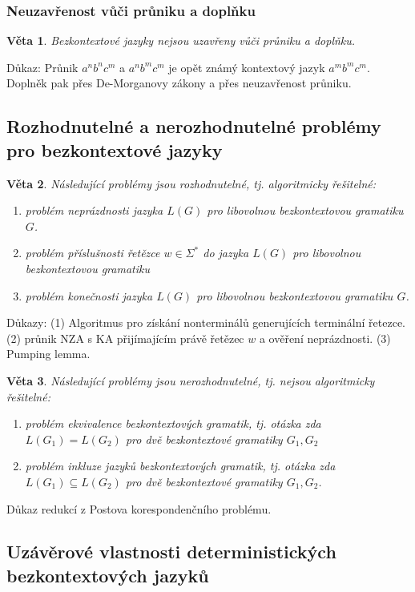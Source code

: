 \documentclass[a4paper, 11pt]{report}
\newtheorem{veta}{Věta}[chapter]
\begin{document}
\subsubsection{Neuzavřenost vůči průniku a doplňku}

\begin{veta}
Bezkontextové jazyky \emph{nejsou} uzavřeny vůči průniku a doplňku.
\end{veta}
Důkaz: Průnik $a^n b^n c^m$ a $a^n b^m c^m$ je opět známý kontextový jazyk $a^m b^m c^m$. Doplněk pak přes De-Morganovy zákony a přes neuzavřenost průniku.

\subsection{Rozhodnutelné a nerozhodnutelné problémy pro bezkontextové jazyky}

\begin{veta}
Následující problémy jsou \emph{rozhodnutelné}, tj. algoritmicky řešitelné:
\begin{enumerate}
	\item problém \emph{neprázdnosti jazyka} $L(G)$ pro libovolnou bezkontextovou gramatiku $G$.
	\item problém \emph{příslušnosti řetězce $w \in \Sigma^*$ do jazyka $L(G)$} pro libovolnou bezkontextovou gramatiku
	\item problém \emph{konečnosti jazyka $L(G)$} pro libovolnou bezkontextovou gramatiku $G$.
\end{enumerate}
\end{veta}
Důkazy: (1) Algoritmus pro získání nonterminálů generujících terminální řetezce. (2) průnik NZA s KA přijímajícím právě řetězec $w$ a ověření neprázdnosti. (3) Pumping lemma.

\begin{veta}
Následující problémy jsou \emph{nerozhodnutelné}, tj. nejsou algoritmicky řešitelné:
\begin{enumerate}
	\item problém \emph{ekvivalence bezkontextových gramatik}, tj. otázka zda $L(G_1) = L(G_2)$ pro dvě bezkontextové gramatiky $G_1, G_2$
	\item problém \emph{inkluze jazyků bezkontextových gramatik}, tj. otázka zda $L(G_1) \subseteq L(G_2)$ pro dvě bezkontextové gramatiky $G_1, G_2$.
\end{enumerate}
\end{veta}
Důkaz redukcí z Postova korespondenčního problému.

\subsection{Uzávěrové vlastnosti deterministických bezkontextových jazyků}
\end{document}
